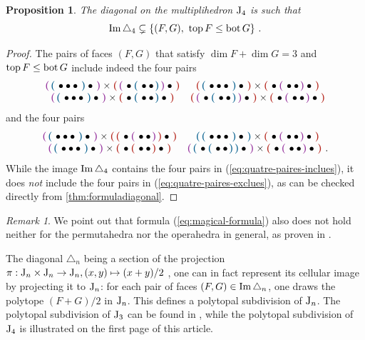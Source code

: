\documentclass[twoside, 11pt]{amsart}
\newtheorem{proposition}[definition]{Proposition}
\theoremstyle{remark}
\newtheorem{remark}[definition]{\sc Remark}
\begin{document}
\begin{proposition} \label{prop:pas-top-bot}
The diagonal on the multiplihedron $\mathrm{J}_4$ is such that
\[ \Ima \triangle_4 \subsetneq \{ (F,G) , \ \tp F\leq \bm G \} \ . \]
\end{proposition}
\begin{proof}
The pairs of faces $(F,G)$ that satisfy $\dim F + \dim G = 3$ and $\operatorname{top} F\leq \operatorname{bot} G$ include indeed the four pairs 
\begin{equation} \label{eq:quatre-paires-inclues}
\begin{matrix}
\purple{\blue{\bullet \bullet \bullet}\bullet} \times \red{\purple{\bullet\blue{\bullet\bullet}}\bullet} & 
\red{\blue{\bullet\bullet\bullet}\bullet} \times \red{\bullet\purple{\bullet\bullet}\bullet}  \\
\purple{\blue{\bullet\bullet\bullet}\bullet} \times \red{\bullet\blue{\bullet\bullet}\bullet} &
\red{\purple{\bullet\blue{\bullet\bullet}}\bullet} \times \red{\bullet\purple{\bullet\bullet}\bullet}  
\end{matrix}
\end{equation}
and the four pairs
\begin{equation} \label{eq:quatre-paires-exclues}
\begin{matrix}
\purple{\blue{\bullet \bullet \bullet}\bullet} \times \red{\red{\bullet\purple{\bullet\bullet}}\bullet} & 
\blue{\blue{\bullet\bullet\bullet}\bullet} \times \red{\bullet\purple{\bullet\bullet}\bullet}  \\
\purple{\blue{\bullet\bullet\bullet}\bullet} \times \red{\bullet\red{\bullet\bullet}\bullet} &
\purple{\blue{\bullet\blue{\bullet\bullet}}\bullet} \times \red{\bullet\purple{\bullet\bullet}\bullet}  \ .
\end{matrix}
\end{equation}
While the image $\operatorname{Im} \triangle_4$ contains the four pairs in (\ref{eq:quatre-paires-inclues}), it does \emph{not} include the four pairs in (\ref{eq:quatre-paires-exclues}), as can be checked directly from \cref{thm:formuladiagonal}.
\end{proof}

\begin{remark}
We point out that formula (\ref{eq:magical-formula}) also does not hold neither for the permutahedra nor the operahedra in general, as proven in \cite[Section 3.2]{LA21}. 
\end{remark}

The diagonal $\triangle_n$ being a section of the projection $\pi : \mathrm{J}_n \times \mathrm{J}_n \to \mathrm{J}_n , (x,y) \mapsto (x+y)/2$ \cite[Proposition 1.1]{LA21}, one can in fact represent its cellular image by projecting it to $\mathrm{J}_n$: for each pair of faces $(F,G) \in \operatorname{Im} \triangle_n$, one draws the polytope $(F+G)/2$ in $\mathrm{J}_n$. This defines a polytopal subdivision of $\mathrm{J}_n$. The polytopal subdivision of $\mathrm{J}_3$ can be found in \cite[Figure 3]{LA21}, while the polytopal subdivision of $\mathrm{J}_4$ is illustrated on the first page of this article.
\end{document}
